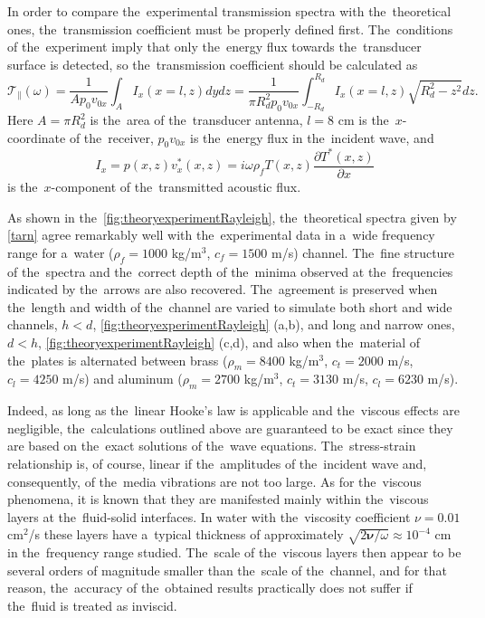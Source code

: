 In order to compare the~experimental transmission spectra \cite{channel1} with the~theoretical ones, the~transmission coefficient must be properly defined first.
The~conditions of the~experiment imply that only the~energy flux towards the~transducer surface is detected, so the~transmission coefficient should be calculated as
\begin{equation}
\label{tarn}
\mathcal{T}_{\|}(\omega) =\frac{1}{A p_0 v_{0x}} \int_A I_{x}(x=l,z) dydz
 = \frac{1}{\pi R_d^2 p_0 v_{0x}} \int_{-R_d}^{R_d} I_{x}(x=l,z) \sqrt{R_d^2-z^2} dz.
\end{equation}
Here $A=\pi R_d^2$ is the~area of the~transducer antenna, $l=8$ cm is the~$x$-coordinate of the~receiver, $p_0 v_{0x}$ is the~energy flux in the~incident wave, and 
\begin{equation}
I_{x}=p(x,z) v^{*}_x(x,z)=i \omega \rho_f T(x,z) \frac{\partial T^{\ast}(x,z)}{\partial x}
\end{equation}
is the~$x$-component of the~transmitted acoustic flux.

As shown in the~\cref{fig:theoryexperimentRayleigh}, the~theoretical spectra given by \cref{tarn} agree remarkably well with the~experimental data in a~wide frequency range for a~water ($\rho_f=1000$ kg/m$^3$, $c_f=1500$ m/s) channel.
The~fine structure of the~spectra and the~correct depth of the~minima observed at the~frequencies indicated by the~arrows are also recovered.
The~agreement is preserved when the~length and width of the~channel are varied to simulate both short and wide channels, $h < d$, \cref{fig:theoryexperimentRayleigh} (a,b), and long and narrow ones, $d < h$, \cref{fig:theoryexperimentRayleigh} (c,d), and also when the~material of the~plates is alternated between brass ($\rho_m=8400$ kg/m$^3$, $c_t=2000$ m/s, $c_l=4250$ m/s) and aluminum ($\rho_m=2700$ kg/m$^3$, $c_t=3130$ m/s, $c_l=6230$ m/s).

Indeed, as long as the~linear Hooke's law is applicable and the~viscous effects are negligible, the~calculations outlined above are guaranteed to be exact since they are based on the~exact solutions of the~wave equations.
The~stress-strain relationship is, of course, linear if the~amplitudes of the~incident wave and, consequently, of the~media vibrations are not too large.
As for the~viscous phenomena, it is known that they are manifested mainly within the~viscous layers at the~fluid-solid interfaces.
In water with the~viscosity coefficient $\nu=0.01$ cm$^2$/s these layers have a~typical thickness of approximately $\sqrt{2\mathbf{\nu}/\omega} \approx 10^{-4}$ cm in the~frequency range studied.
The~scale of the~viscous layers then appear to be several orders of magnitude smaller than the~scale of the~channel, and for that reason, the~accuracy of the~obtained results practically does not suffer if the~fluid is treated as inviscid.

